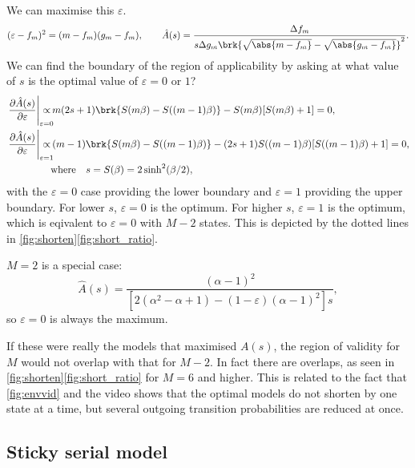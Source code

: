 \documentclass[12pt]{article}
\renewcommand{\pdiff}[2]{\frac{\partial #1}{\partial #2}}
\begin{document}
We can maximise this \wrt $\varepsilon$.
%
\begin{equation}\label{eq:shortopt}
  (\varepsilon - f_m)^2 = (m - f_m)(g_m - f_m),
  \qquad
  \hat{A}(s) = \frac{\Delta f_{m}}
      {s \Delta g_{m} \brk{\sqrt{\abs{m - f_m}} - \sqrt{\abs{g_m - f_m}}}^2}.
\end{equation}
%
We can find the boundary of the region of applicability by asking at what value of $s$ is the optimal value of $\varepsilon=0$ or $1$?
%
\begin{equation}\label{eq:shortenvalid}
\begin{aligned}
  \left.\pdiff{\hat{A}(s)}{\varepsilon}\right|_{\mathrlap{\varepsilon=0}} \propto &\,
    m(2s+1) \brk{S(m\beta) - S((m-1)\beta)} - S(m\beta) [S(m\beta) + 1]
      = 0,\\
  \left.\pdiff{\hat{A}(s)}{\varepsilon}\right|_{\mathrlap{\varepsilon=1}} \propto &\,
    (m-1)\brk{S(m\beta) - S((m-1)\beta)} - (2s+1) S((m-1)\beta) [S((m-1)\beta) + 1]
      = 0,\\
    &\text{where}\quad
    s = S(\beta) = 2 \sinh^2(\beta/2),
\end{aligned}
\end{equation}
%
with the $\varepsilon=0$ case providing the lower boundary and $\varepsilon=1$ providing the upper boundary.
For lower \(s\), \(\varepsilon = 0\) is the optimum. 
For higher \(s\), \(\varepsilon = 1\) is the optimum, which is eqivalent to \(\varepsilon = 0\) with \(M-2\) states.
This is depicted by the dotted lines in \cref{fig:shorten}\ref{fig:short_ratio}.

\(M=2\) is a special case:
%
\begin{equation*}
  \hat{A}(s) = \frac{(\alpha-1)^2}
                    {[2(\alpha^2-\alpha+1) - (1-\varepsilon) (\alpha-1)^2]s},
\end{equation*}
%
so \(\varepsilon=0\) is always the maximum.

If these were really the models that maximised $A(s)$, the region of validity for $M$ would not overlap with that for $M-2$.
In fact there are overlaps, as seen in \cref{fig:shorten}\ref{fig:short_ratio} for \(M=6\) and higher.
This is related to the fact that \autoref{fig:envvid} and the video shows that the optimal models do not shorten by one state at a time, but several outgoing transition probabilities are reduced at once.



\subsection{Sticky serial model}\label{sec:serial_sticky}
\end{document}
